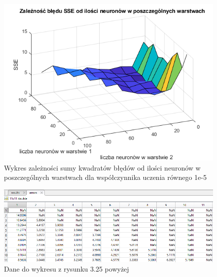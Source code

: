 \documentclass[a4paper, 12pt]{article}
\begin{document}
\clearpage

\begin{figure}[ht]
	\centering
	\includegraphics[width=12cm]{images/lr5 sse}
	\caption{Wykres zależności sumy kwadratów błędów od ilości neuronów w poszczególnych warstwach dla współczynnika uczenia równego 1e-5}
\label{Fig:lr1 sse}
\end{figure}

\begin{figure}[ht]
	\centering
	\includegraphics[width=12cm]{images/lr5 sse dane}
	\caption{Dane do wykresu z rysunku 3.25 powyżej}
\label{Fig:lr1 sse dane}
\end{figure}

\clearpage

\newpage
\end{document}
